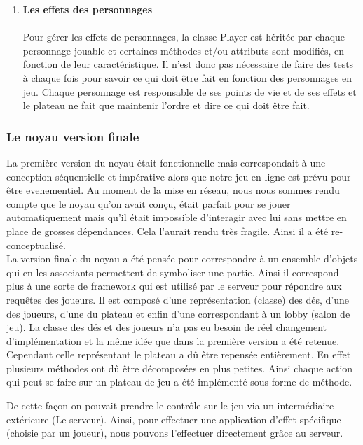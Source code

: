 \documentclass[a4paper,11pt]{article}
\begin{document}
\begin{enumerate}
	\item \textbf{Les effets des personnages} \\\\
	Pour gérer les effets de personnages, la classe Player est héritée par chaque personnage jouable et certaines méthodes et/ou attributs sont modifiés, en fonction de leur caractéristique. Il n’est donc pas nécessaire de faire des tests à chaque fois pour savoir ce qui doit être fait en fonction des personnages en jeu. Chaque personnage est responsable de ses points de vie et de ses effets et le plateau ne fait que maintenir l’ordre et dire ce qui doit être fait.

\end{enumerate}

\subsubsection{Le noyau version finale}

	La première version du noyau était fonctionnelle mais correspondait à une conception séquentielle et impérative alors que notre jeu en ligne est prévu pour être evenementiel.  Au moment de la mise en réseau, nous nous sommes rendu compte que le noyau qu’on avait conçu, était parfait pour se jouer automatiquement mais qu’il était impossible d’interagir avec lui sans mettre en place de grosses dépendances. Cela l’aurait rendu très fragile. Ainsi il a été re-conceptualisé. \\
	 
	La version finale du noyau a été pensée pour correspondre à un ensemble d’objets qui en les associants permettent de symboliser une partie. Ainsi il correspond plus à une sorte de framework qui est utilisé par le serveur pour répondre aux requêtes des joueurs. Il est composé d’une représentation (classe) des dés, d'une des joueurs, d'une du plateau et enfin d'une correspondant à un lobby (salon de jeu). 
    La classe des dés et des joueurs n’a pas eu besoin de réel changement d'implémentation et la même idée que dans la première version a été retenue. Cependant celle représentant le plateau a dû être repensée entièrement. En effet plusieurs méthodes ont dû être décomposées en plus petites. Ainsi chaque action qui peut se faire sur un plateau de jeu a été implémenté sous forme de méthode.
	
\newpage

	 De cette façon on pouvait prendre le contrôle sur le jeu via un intermédiaire extérieure (Le serveur). Ainsi, pour effectuer une application d'effet spécifique (choisie par un joueur), nous pouvons l’effectuer directement grâce au serveur. \\
	
\end{document}

